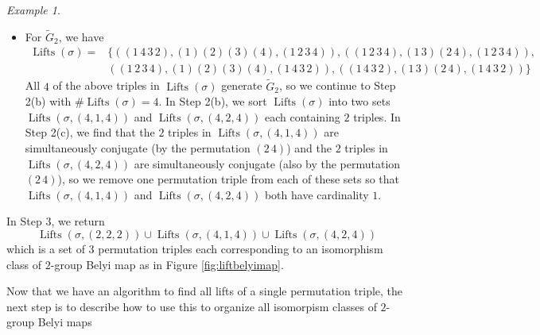 \documentclass{dcthesis}
\newcommand{\wt}[1]{\widetilde{#1}}
\DeclareMathOperator{\Lifts}{Lifts}
\theoremstyle{definition}
\theoremstyle{remark}
\newtheorem{example}[prop]{Example}
\numberwithin{equation}{section}
\numberwithin{figure}{section}
\begin{document}
{{\begin{example}
\begin{itemize}
\begin{align*}
          \end{align*}
          In Step 2(b) we sort $\Lifts(\sigma)$ into passports as determined by orders of elements.
          Here, all $\wt{\sigma}\in\Lifts(\sigma)$ have the same orders
          (and hence belong to the same passport).
          Thus we get a single set $\Lifts(\sigma,(2,2,2)) = \Lifts(\sigma)$.
          Lastly,
          in Step 2(c) we see that that the two triples in
          $\Lifts(\sigma, (2,2,2))$ are simultaneously conjugate
          (by the permutation $(2\,4)$)
          and hence we remove one of the triples from $\Lifts(\sigma, (2,2,2))$.
        \item
          For $\wt{G}_2$, we have
          \begin{align*}
            \Lifts(\sigma) =
            &\Big\{
              ((1\,4\,3\,2), (1)(2)(3)(4), (1\,2\,3\,4)),
              ((1\,2\,3\,4), (1\,3)(2\,4), (1\,2\,3\,4)),\\
            &((1\,2\,3\,4),  (1)(2)(3)(4), (1\,4\,3\,2)),
              ((1\,4\,3\,2), (1\,3)(2\,4), (1\,4\,3\,2))
            \Big\}
          \end{align*}
          All $4$ of the above triples in $\Lifts(\sigma)$
          generate $\wt{G}_2$, so we continue to Step 2(b) with
          $\#\Lifts(\sigma) = 4$.
          In Step 2(b),
          we sort $\Lifts(\sigma)$ into two sets
          $\Lifts(\sigma, (4,1,4))$ and $\Lifts(\sigma,(4,2,4))$
          each containing $2$ triples.
          In Step 2(c),
          we find that the $2$ triples in $\Lifts(\sigma, (4,1,4))$
          are simultaneously conjugate
          (by the permutation $(2\,4)$)
          and the $2$ triples in $\Lifts(\sigma, (4,2,4))$
          are simultaneously conjugate
          (also by the permutation $(2\,4)$),
          so we remove one permutation triple from each of these sets
          so that $\Lifts(\sigma, (4,1,4))$
          and
          $\Lifts(\sigma, (4,2,4))$ both have cardinality $1$.
      \end{itemize}
      In Step 3,
      we return
      \[
        \Lifts(\sigma, (2,2,2))\cup\Lifts(\sigma, (4,1,4))\cup\Lifts(\sigma, (4,2,4))
      \]
      which is a set of $3$ permutation triples
      each corresponding to an isomorphism class of $2$-group Belyi map
      as in Figure \ref{fig:liftbelyimap}.
    \end{example}
    Now that we have an algorithm to find all lifts of a single
    permutation triple,
    the next step is to describe how to use this
    to organize all isomorpism classes of $2$-group Belyi maps
}}
\end{document}
